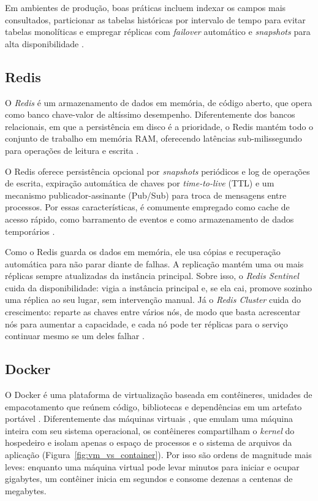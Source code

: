 \par Em ambientes de produção, boas práticas incluem indexar os campos mais consultados, particionar as tabelas históricas por intervalo de tempo para evitar tabelas monolíticas e empregar réplicas com \emph{failover} automático e \emph{snapshots} para alta disponibilidade \cite{DAMIN2022_MELHORES_PRATICAS_E3, SALVADOR2019_AQUISICAO_REDUNDANCIA}.

\subsection{Redis}

\par O \emph{Redis} é um armazenamento de dados em memória, de código aberto, que opera como banco chave-valor de altíssimo desempenho. Diferentemente dos bancos relacionais, em que a persistência em disco é a prioridade, o Redis mantém todo o conjunto de trabalho em memória RAM, oferecendo latências sub-milissegundo para operações de leitura e escrita  \cite{REDIS_DOCS}.

\par O Redis oferece persistência opcional por \emph{snapshots} periódicos e log de operações de escrita, expiração automática de chaves por \emph{time-to-live} (TTL) e um mecanismo publicador-assinante (Pub/Sub) para troca de mensagens entre processos. Por essas características, é comumente empregado como cache de acesso rápido, como barramento de eventos e como armazenamento de dados temporários \cite{REDIS_DOCS}.

\par Como o Redis guarda os dados em memória, ele usa cópias e recuperação automática para não parar diante de falhas. A replicação mantém uma ou mais réplicas sempre atualizadas da instância principal. Sobre isso, o \emph{Redis Sentinel} cuida da disponibilidade: vigia a instância principal e, se ela cai, promove sozinho uma réplica ao seu lugar, sem intervenção manual. Já o \emph{Redis Cluster} cuida do crescimento: reparte as chaves entre vários nós, de modo que basta acrescentar nós para aumentar a capacidade, e cada nó pode ter réplicas para o serviço continuar mesmo se um deles falhar \cite{REDIS_DOCS}.

\subsection{Docker}

\par O Docker é uma plataforma de virtualização baseada em contêineres, unidades de empacotamento que reúnem código, bibliotecas e dependências em um artefato portável \cite{DOCKER_DOCS}. Diferentemente das máquinas virtuais \cite{SALVADOR2019_VIRTUALIZACAO}, que emulam uma máquina inteira com seu sistema operacional, os contêineres compartilham o \emph{kernel} do hospedeiro e isolam apenas o espaço de processos e o sistema de arquivos da aplicação (Figura~\ref{fig:vm_vs_container}). Por isso são ordens de magnitude mais leves: enquanto uma máquina virtual pode levar minutos para iniciar e ocupar gigabytes, um contêiner inicia em segundos e consome dezenas a centenas de megabytes.

